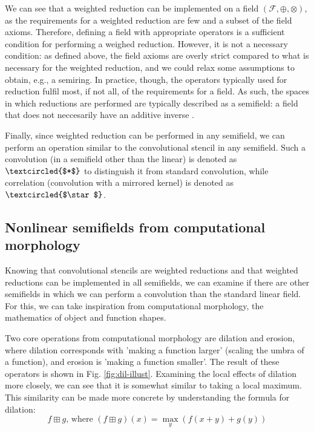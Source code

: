 \documentclass[11pt]{article} %
\begin{document}
We can see that a weighted reduction can be implemented on a field $(\mathcal{F}, \oplus, \otimes)$, as the requirements for a weighted reduction are few and a subset of the field axioms. Therefore, defining a field with appropriate operators is a sufficient condition for performing a weighed reduction. However, it is not a necessary condition: as defined above, the field axioms are overly strict compared to what is necessary for the weighted reduction, and we could relax some assumptions to obtain, e.g., a semiring. In practice, though, the operators typically used for reduction fulfil most, if not all, of the requirements for a field. As such, the spaces in which reductions are performed are typically described as a semifield: a field that does not neccesarily have an additive inverse \cite{bellaardaxiomatic}.

Finally, since weighted reduction can be performed in any semifield, we can perform an operation similar to the convolutional stencil in any semifield. Such a convolution (in a semifield other than the linear) is denoted as $\textcircled{$*$}$ to distinguish it from standard convolution, while correlation (convolution with a mirrored kernel) is denoted as $\textcircled{$\star$}$.

\subsection{Nonlinear semifields from computational morphology}
Knowing that convolutional stencils are weighted reductions and that weighted reductions can be implemented in all semifields, we can examine if there are other semifields in which we can perform a convolution than the standard linear field. For this, we can take inspiration from computational morphology, the mathematics of object and function shapes.

Two core operations from computational morphology are dilation and erosion, where dilation corresponds with 'making a function larger' (scaling the umbra of a function), and erosion is 'making a function smaller'. The result of these operators is shown in Fig. \ref{fig:dil-illust}. Examining the local effects of dilation more closely, we can see that it is somewhat similar to taking a local maximum. This similarity can be made more concrete by understanding the formula for dilation: 
$$f \boxplus g \textrm{, where }(f \boxplus g)(x) = \max_y \left(f(x+y) + g(y)\right)$$
\end{document}
